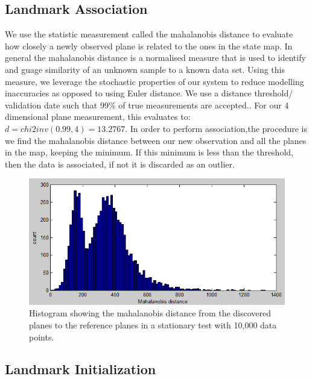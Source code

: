 \documentclass[]{article}
\begin{document}
{%

\subsection{Landmark Association} %
\label{sub:landmark_association}
We use the statistic measurement called the mahalanobis distance to evaluate how closely a newly observed plane is related to the ones in the state map. In general the mahalanobis distance is a normalised measure that is used to identify and guage similarity of an unknown sample to a known data set. Using this measure, we leverage the stochastic properties of our system to reduce modelling inaccuracies as opposed to using Euler distance. We use a distance threshold/ validation date such that 99\% of true measurements are accepted.. For our 4 dimensional plane measurement, this evaluates to:
$ d = chi2inv(0.99,4) = 13.2767$. In order to perform association,the procedure is we find the mahalanobis distance between our new observation and all the planes in the map, keeping the minimum. If this minimum is less than the threshold, then the data is associated, if not it is discarded as an outlier.

\begin{figure}[tb]
	\begin{center}
		\includegraphics[width = \textwidth]{malhala_hist_100bins_10000datapoints_notmoving22}
	\end{center}
	\caption{Histogram showing the mahalanobis distance from the discovered planes to the reference planes in a stationary test with 10,000 data points.}
	\label{fig:mahaldisthist}
\end{figure}


\subsection{Landmark Initialization} %
\label{sub:landmark_initialization}

}
\end{document}
